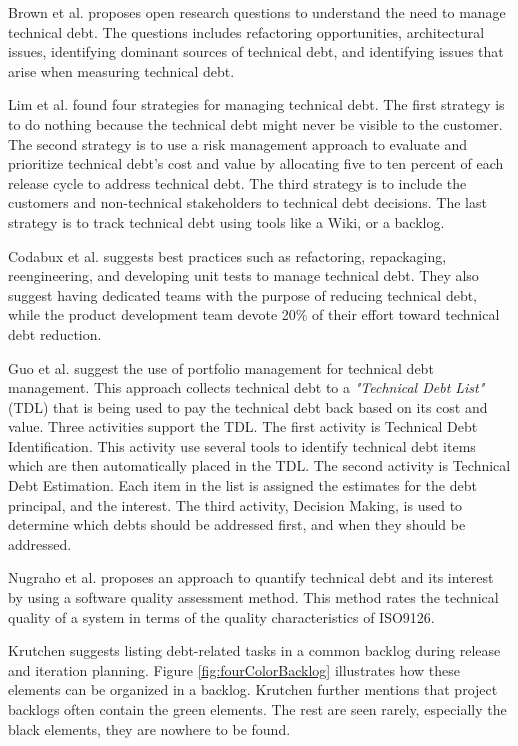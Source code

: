 Brown et al.\cite{foser076-brown} proposes open research questions to understand the need to manage technical debt. The questions includes refactoring opportunities, architectural issues, identifying dominant sources of technical debt, and identifying issues that arise when measuring technical debt.

Lim et al.\cite{lim-taksande} found four strategies for managing technical debt. The first strategy is to do nothing because the technical debt might never be visible to the customer. The second strategy is to use a risk management approach to evaluate and prioritize technical debt's cost and value by allocating five to ten percent of each release cycle to address technical debt. The third strategy is to include the customers and non-technical stakeholders to technical debt decisions. The last strategy is to track technical debt using tools like a Wiki, or a backlog.

Codabux et al.\cite{p8-codabux} suggests best practices such as refactoring, repackaging, reengineering, and developing unit tests to manage technical debt. They also suggest having dedicated teams with the purpose of reducing technical debt, while the product development team devote 20\% of their effort toward technical debt reduction.
	
Guo et al.\cite{p31-guo} suggest the use of portfolio management for technical debt management. This approach collects technical debt to a \textit{"Technical Debt List"} (TDL) that is being used to pay the technical debt back based on its cost and value. Three activities support the TDL. The first activity is Technical Debt Identification. This activity use several tools to identify technical debt items which are then automatically placed in the TDL. The second activity is Technical Debt Estimation. Each item in the list is assigned the estimates for the debt principal, and the interest. The third activity, Decision Making, is used to determine which debts should be addressed first, and when they should be addressed.

Nugraho et al.\cite{p1-nugraho} proposes an approach to quantify technical debt and its interest by using a software quality assessment method. This method rates the technical quality of a system in terms of the quality characteristics of ISO9126. 

Krutchen\cite{krutchen} suggests listing debt-related tasks in a common backlog during release and iteration planning. Figure \ref{fig:fourColorBacklog} illustrates how these elements can be organized in a backlog. Krutchen further mentions that project backlogs often contain the green elements. The rest are seen rarely, especially the black elements, they are nowhere to be found.


